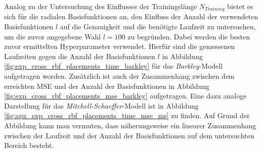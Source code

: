 Analog zu der Untersuchung des Einflusses der Trainingslänge $N_{Training}$ bietet es sich für die radialen Basisfunktionen an, den Einfluss der Anzahl der verwendeten Basisfunktionen $l$ auf die Genauigkeit und die benötigte Laufzeit zu untersuchen, um die zuvor angegebene Wahl $l=100$ zu begründen. Dabei werden die besten zuvor ermittelten Hyperparameter verwendet. Hierfür sind die gemessenen Laufzeiten gegen die Anzahl der Basisfunktionen $l$ in Abbildung \ref{fig:exp_cross_rbf_placements_time_barkley} für das \textit{Barkley}-Modell aufgetragen worden. Zusätzlich ist auch der Zusammenhang zwischen dem erreichten MSE und der Anzahl der Basisfunktionen in Abbildung \ref{fig:exp_cross_rbf_placements_mse_barkley} aufgetragen. Eine dazu analoge Darstellung für das \textit{Mitchell-Schaeffer}-Modell ist in Abbildung \ref{fig:apx_exp_cross_rbf_placements_time_mse_ms} zu finden. Auf Grund der Abbildung kann man vermuten, dass näherungsweise ein linearer Zusammenhang zwischen der Laufzeit und der Anzahl der Basisfunktionen auf dem untersuchten Bereich besteht.\\

